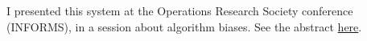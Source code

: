 \documentclass[oneside,10pt]{book}
\begin{document}

\noindent I presented this system  at the Operations Research Society conference (INFORMS), in a session about algorithm biases.
See the abstract \href{https://www.abstractsonline.com/pp8/#!/6818/presentation/6842}{here}.




\printindex



\hypersetup{linkcolor=red} %
\hypersetup{linkcolor=red}
\end{document}
